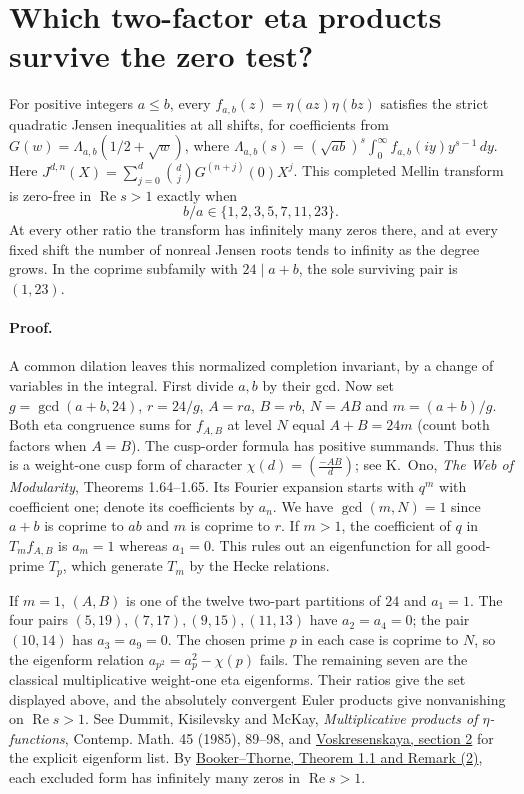 \section{Which two-factor eta products survive the zero test?}
For positive integers $a\le b$, every $f_{a,b}(z)=\eta(az)\eta(bz)$ satisfies
the strict quadratic Jensen inequalities at all shifts, for coefficients from
$G(w)=\Lambda_{a,b}(1/2+\sqrt w)$, where
$\Lambda_{a,b}(s)=(\sqrt{ab})^s\int_0^\infty f_{a,b}(iy)y^{s-1}\,dy$.
Here $J^{d,n}(X)=\sum_{j=0}^d \binom{d}{j}G^{(n+j)}(0)X^j$.
This completed Mellin transform is zero-free in $\operatorname{Re}s>1$ exactly when
\[
                         b/a\in\{1,2,3,5,7,11,23\}.
\]
At every other ratio the transform has infinitely many zeros there, and
at every fixed shift the number of nonreal Jensen roots tends to infinity
as the degree grows. In the coprime
subfamily with $24\mid a+b$, the sole surviving pair is $(1,23)$.

\paragraph{Proof.}
A common dilation leaves this normalized completion invariant, by a change of variables in the integral.
First divide $a,b$ by their gcd. Now set $g=\gcd(a+b,24)$, $r=24/g$,
$A=ra$, $B=rb$, $N=AB$ and $m=(a+b)/g$. Both eta congruence sums for
$f_{A,B}$ at level $N$ equal $A+B=24m$ (count both factors when $A=B$).
The cusp-order formula has positive summands. Thus this is a weight-one
cusp form of character $\chi(d)=(\frac{-AB}{d})$; see
K.~Ono, \emph{The Web of Modularity}, Theorems 1.64--1.65.
Its Fourier expansion starts with $q^m$ with coefficient one; denote its
coefficients by $a_n$. We have $\gcd(m,N)=1$ since $a+b$ is coprime to
$ab$ and $m$ is coprime to $r$.
If $m>1$, the coefficient of $q$ in $T_m f_{A,B}$ is $a_m=1$ whereas
$a_1=0$. This rules out an eigenfunction for all good-prime $T_p$,
which generate $T_m$ by the Hecke relations.

If $m=1$, $(A,B)$ is one of the twelve two-part partitions of $24$ and
$a_1=1$. The four pairs $(5,19),(7,17),(9,15),(11,13)$ have $a_2=a_4=0$;
the pair $(10,14)$ has $a_3=a_9=0$. The chosen prime $p$ in each case
is coprime to $N$, so the eigenform relation $a_{p^2}=a_p^2-\chi(p)$ fails.
The remaining seven are the classical multiplicative weight-one eta
eigenforms. Their ratios give the set displayed above, and the absolutely
convergent Euler products give nonvanishing on $\operatorname{Re}s>1$.
See Dummit, Kisilevsky and McKay, \emph{Multiplicative products of
$\eta$-functions}, Contemp. Math. 45 (1985), 89--98, and
\href{https://www.numdam.org/item/10.5802/jtnb.495.pdf}{Voskresenskaya, section 2}
for the explicit eigenform list. By
\href{https://research-information.bris.ac.uk/ws/files/95488278/mf_zeros_revised.pdf}
{Booker--Thorne, Theorem 1.1 and Remark (2)}, each excluded form
has infinitely many zeros in $\operatorname{Re}s>1$.

